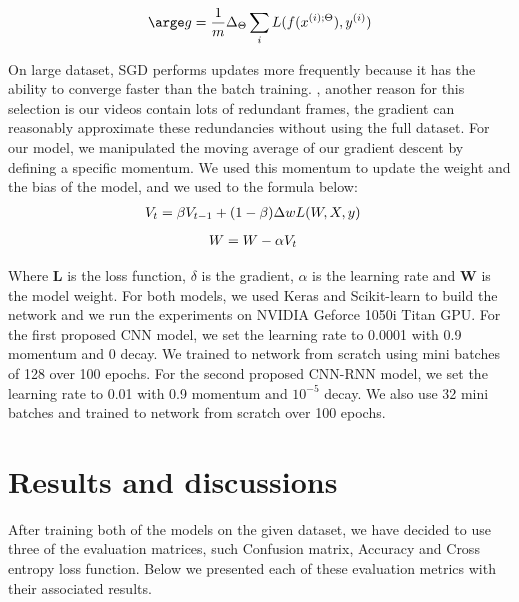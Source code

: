 \documentclass{vldb}
\begin{document}
\begin{equation}
\label{eq:equ3}
    \arge g=\frac{1}{m}\Delta _{\Theta }\sum _{i}L(f(x^{(i);\Theta }), y^{(i)})
\end{equation}

On large dataset, SGD performs updates more frequently because it has the ability to converge faster than the batch training. , another reason for this selection is our videos contain lots of redundant frames, the gradient can reasonably approximate these redundancies without using the full dataset. For our model, we manipulated the moving average of our gradient descent by defining a specific momentum. We used this momentum to update the weight and the bias of the model, and we used to the formula below: 
\begin{align}
   & \large V_{t}=\beta V_{t-1}+(1-\beta )\Delta wL(W,X,y)
\end{align}
\begin{align}
   & \large W=W-\alpha V_{t}
\end{align}

Where \textbf{L} is the loss function,  \textbf{$\delta$} is the gradient, \textbf{$\alpha$} is the learning rate and \textbf{W} is the model weight.
For both models, we used Keras and Scikit-learn to build the network and we run the experiments on NVIDIA Geforce 1050i Titan GPU.
For the first proposed CNN model, we set the learning rate to 0.0001 with 0.9 momentum and 0 decay. We trained to network from scratch using mini batches of 128 over 100 epochs.
For the second proposed CNN-RNN model, we set the learning rate to 0.01 with 0.9 momentum and $10^{-5}$ decay. We also use 32 mini batches and trained to network from scratch over 100 epochs.

\section{Results and discussions}
After training both of the models on the given dataset, we have decided to use three of the evaluation matrices, such Confusion matrix, Accuracy and Cross entropy loss function. Below we presented each of these evaluation metrics with their associated results.\\
\end{document}
